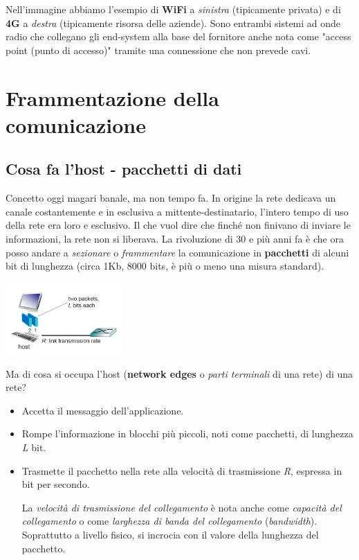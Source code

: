 \documentclass[10pt, a4paper, openany]{book}
\begin{document}
\noindent Nell'immagine abbiamo l'esempio di \textbf{WiFi} a \textit{sinistra} (tipicamente privata) e di \textbf{4G} a \textit{destra} (tipicamente risorsa delle aziende). Sono entrambi sistemi ad onde radio che collegano gli end-system alla base del fornitore anche nota come "access point (punto di accesso)" tramite una connessione che non prevede cavi.

\section{Frammentazione della comunicazione}

\subsection{Cosa fa l'host - pacchetti di dati}

\noindent Concetto oggi magari banale, ma non tempo fa. In origine la rete dedicava un canale costantemente e in esclusiva a mittente-destinatario, l'intero tempo di uso della rete era loro e esclusivo. Il che vuol dire che finché non finivano di inviare le informazioni, la rete non si liberava. La rivoluzione di 30 e più anni fa è che ora posso andare a \textit{sezionare} o \textit{frammentare} la comunicazione in \textbf{pacchetti} di alcuni bit di lunghezza (circa 1Kb, 8000 bits, è più o meno una misura standard).

\begin{center}
    \includegraphics[width=45mm]{cap1 - Introduzione alle reti - 6.jpg}
\end{center}

\noindent Ma di cosa si occupa l'host (\textbf{network edges} o \textit{parti terminali} di una rete) di una rete?
\begin{itemize}
    \item Accetta il messaggio dell'applicazione.
    \item Rompe l'informazione in blocchi più piccoli, noti come pacchetti, di lunghezza \textit{L} bit.
    \item Trasmette il pacchetto nella rete alla velocità di trasmissione \textit{R}, espressa in bit per secondo.
    
    La \textit{velocità di trasmissione del collegamento} è nota anche come \textit{capacità del collegamento} o come \textit{larghezza di banda del collegamento} (\textit{bandwidth}). Soprattutto a livello fisico, si incrocia con il valore della lunghezza del pacchetto.
\end{itemize}
\end{document}
